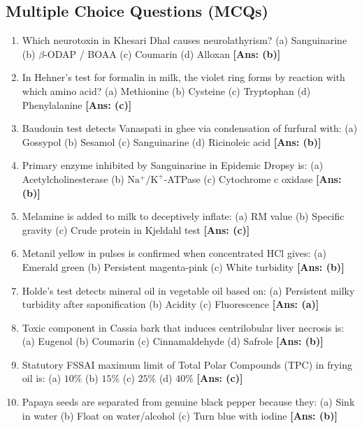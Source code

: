 \documentclass[10pt,a4paper,oneside]{article}
\begin{document}
\subsection{Multiple Choice Questions (MCQs)}
\begin{enumerate}[leftmargin=*]
    \item Which neurotoxin in Khesari Dhal causes neurolathyrism?  
    (a) Sanguinarine \quad (b) $\beta$-ODAP / BOAA \quad (c) Coumarin \quad (d) Alloxan \hfill \textbf{[Ans: (b)]}
    \item In Hehner's test for formalin in milk, the violet ring forms by reaction with which amino acid?  
    (a) Methionine \quad (b) Cysteine \quad (c) Tryptophan \quad (d) Phenylalanine \hfill \textbf{[Ans: (c)]}
    \item Baudouin test detects Vanaspati in ghee via condensation of furfural with:  
    (a) Gossypol \quad (b) Sesamol \quad (c) Sanguinarine \quad (d) Ricinoleic acid \hfill \textbf{[Ans: (b)]}
    \item Primary enzyme inhibited by Sanguinarine in Epidemic Dropsy is:  
    (a) Acetylcholinesterase \quad (b) $\mathrm{Na^+/K^+}$-ATPase \quad (c) Cytochrome c oxidase \hfill \textbf{[Ans: (b)]}
    \item Melamine is added to milk to deceptively inflate:  
    (a) RM value \quad (b) Specific gravity \quad (c) Crude protein in Kjeldahl test \hfill \textbf{[Ans: (c)]}
    \item Metanil yellow in pulses is confirmed when concentrated $\mathrm{HCl}$ gives:  
    (a) Emerald green \quad (b) Persistent magenta-pink \quad (c) White turbidity \hfill \textbf{[Ans: (b)]}
    \item Holde's test detects mineral oil in vegetable oil based on:  
    (a) Persistent milky turbidity after saponification \quad (b) Acidity \quad (c) Fluorescence \hfill \textbf{[Ans: (a)]}
    \item Toxic component in Cassia bark that induces centrilobular liver necrosis is:  
    (a) Eugenol \quad (b) Coumarin \quad (c) Cinnamaldehyde \quad (d) Safrole \hfill \textbf{[Ans: (b)]}
    \item Statutory FSSAI maximum limit of Total Polar Compounds (TPC) in frying oil is:  
    (a) $10\%$ \quad (b) $15\%$ \quad (c) $25\%$ \quad (d) $40\%$ \hfill \textbf{[Ans: (c)]}
    \item Papaya seeds are separated from genuine black pepper because they:  
    (a) Sink in water \quad (b) Float on water/alcohol \quad (c) Turn blue with iodine \hfill \textbf{[Ans: (b)]}
\end{enumerate}
\end{document}
